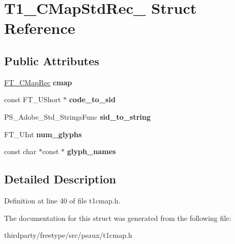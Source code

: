 \hypertarget{struct_t1___c_map_std_rec__}{}\section{T1\+\_\+\+C\+Map\+Std\+Rec\+\_\+ Struct Reference}
\label{struct_t1___c_map_std_rec__}
\subsection*{Public Attributes}
\begin{DoxyCompactItemize}
\item 
\mbox{\label{struct_t1___c_map_std_rec___a482349330d91488ef43824134cd69ab5}} 
\hyperlink{struct_f_t___c_map_rec__}{F\+T\+\_\+\+C\+Map\+Rec} {\bfseries cmap}
\item 
\mbox{\label{struct_t1___c_map_std_rec___a7ade6df788a54dfc449f3152bab78016}} 
const F\+T\+\_\+\+U\+Short $\ast$ {\bfseries code\+\_\+to\+\_\+sid}
\item 
\mbox{\label{struct_t1___c_map_std_rec___a41657430581f24f413fcb086e4d46ac7}} 
P\+S\+\_\+\+Adobe\+\_\+\+Std\+\_\+\+Strings\+Func {\bfseries sid\+\_\+to\+\_\+string}
\item 
\mbox{\label{struct_t1___c_map_std_rec___a8021567362767fae9912524311293af4}} 
F\+T\+\_\+\+U\+Int {\bfseries num\+\_\+glyphs}
\item 
\mbox{\label{struct_t1___c_map_std_rec___a0924165bae0e31240459d63126567ce5}} 
const char $\ast$const  $\ast$ {\bfseries glyph\+\_\+names}
\end{DoxyCompactItemize}


\subsection{Detailed Description}


Definition at line 40 of file t1cmap.\+h.



The documentation for this struct was generated from the following file\+:\begin{DoxyCompactItemize}
\item 
thirdparty/freetype/src/psaux/t1cmap.\+h\end{DoxyCompactItemize}
